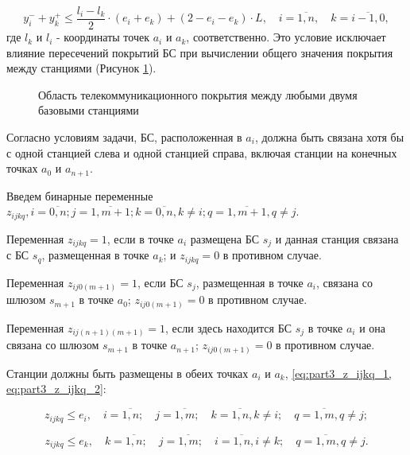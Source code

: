 \begin{equation}
  \label{eq:part3_yi_4}
  y_i^- + y_k^+  \leq \frac{l_i-l_k}{2} \cdot (e_i + e_k) + (2 - e_i - e_k) \cdot L, \quad i = \overline{1,n}, \quad k = \overline{i-1,0},
\end{equation}
где $ l_k $ и $ l_i $ - координаты точек $ a_i $ и $ a_k $, соответственно. Это условие исключает влияние пересечений покрытий БС при вычислении общего значения покрытия между станциями (Рисунок \cref{fig:part3_total_coverage_between_points}).

\begin{figure}[ht]
  \caption{Область телекоммуникационного покрытия между любыми двумя базовыми станциями}\label{fig:part3_total_coverage_between_points}
\end{figure}

Согласно условиям задачи, БС, расположенная в $ a_i $, должна быть связана хотя бы с одной станцией слева и одной станцией справа, включая станции на конечных точках $ a_0 $ и $a_{n + 1}$. 

Введем бинарные переменные $z_{ijkq}, i = \overline{0,n}; j= \overline{1,m+1}; k=\overline{0,n},  k \neq i; q= \overline{1,m+1}, q \neq j$.

Переменная $ z_ {ijkq} = 1$, если в точке $ a_i $ размещена БС $ s_j $ и данная станция связана с БС $ s_q $, размещенная в точке $ a_k $; и $ z_ {ijkq} = 0 $ в противном случае.

Переменная $ z_{ij0(m + 1)} = 1$, если БС $ s_j $, размещенная в точке $ a_i $, связана со шлюзом $ s_{m + 1} $ в точке $ a_0 $; $ z_{ij0 (m + 1)} = 0 $ в противном случае.
 
Переменная $ z_{ij(n + 1)(m + 1)} = 1 $, если здесь находится БС $ s_j $ в точке $ a_i $ и она связана со шлюзом $ s_{m + 1} $ в точке $ a_{n + 1} $; $ z_{ij0(m + 1)} = 0 $  в противном случае.

Станции должны быть размещены в обеих точках $ a_i $ и $ a_k $, \cref{eq:part3_z_ijkq_1, eq:part3_z_ijkq_2}:

\begin{equation}
  \label{eq:part3_z_ijkq_1}
  z_{ijkq} \leq e_i , \quad i = \overline{1, n}; \quad j = \overline{1, m}; \quad k = \overline{1,n}, k \neq i; \quad q = \overline{1,m}, q \neq j;
\end{equation}


\begin{equation}
  \label{eq:part3_z_ijkq_2}
  z_{ijkq} \leq e_k , \quad k = \overline{1, n}; \quad j = \overline{1, m}; \quad i = \overline{1,n}, i \neq k; \quad q = \overline{1,m}, q \neq j.
\end{equation}

